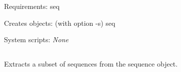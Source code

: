 \begin{description}
\begin{enumerate}
\begin{verbatim}
\end{verbatim}

\end{enumerate}


\item{Requirements:} seq


\item{Creates objects:} (with option -s) seq


\item{System scripts:} {\em None}

\end{description}



\subsection[seq\_pick]{  }



Extracts a subset of sequences from the sequence object.


